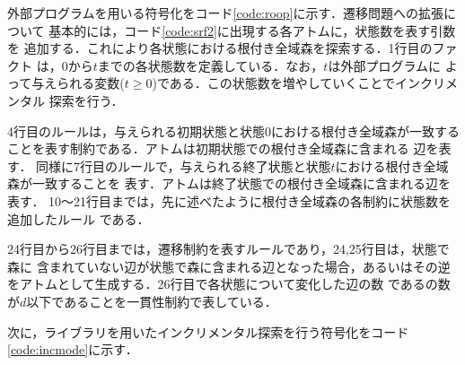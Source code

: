 外部プログラムを用いる符号化をコード\ref{code:roop}に示す．遷移問題への拡張について
基本的には，コード\ref{code:srf2}に出現する各アトムに，状態数を表す引数を
追加する．これにより各状態における根付き全域森を探索する．1行目のファクト
は，0から$t$までの各状態数を定義している．なお，$t$は外部プログラムに
よって与えられる変数($t \geq 0$)である．この状態数を増やしていくことでインクリメンタル
探索を行う．

4行目のルールは，与えられる初期状態と状態0における根付き全域森が一致する
ことを表す制約である．アトムは初期状態での根付き全域森に含まれる
辺を表す．
同様に7行目のルールで，与えられる終了状態と状態$t$における根付き全域森が一致することを
表す．アトムは終了状態での根付き全域森に含まれる辺を表す．
10〜21行目までは，先に述べたように根付き全域森の各制約に状態数を追加したルール
である．

24行目から26行目までは，遷移制約を表すルールであり，24,25行目は，状態で森に
含まれていない辺が状態で森に含まれる辺となった場合，あるいはその逆
をアトムとして生成する．26行目で各状態について変化した辺の数
であるの数が$d$以下であることを一貫性制約で表している．

次に，ライブラリを用いたインクリメンタル探索を行う符号化をコード\ref{code:incmode}に示す．

